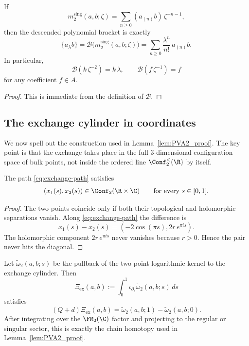 \begin{lemma}
\label{lem:two-point-dictionary}
If
\[
m_2^{\mathrm{sing}}(a,b;\zeta)=\sum_{n\ge0}(a_{(n)}b)\,\zeta^{-n-1},
\]
then the descended polynomial bracket is exactly
\[
\{a_\lambda b\}=\mathcal B\bigl(m_2^{\mathrm{sing}}(a,b;\zeta)\bigr)
=
\sum_{n\ge0}\frac{\lambda^n}{n!}\,a_{(n)}b.
\]
In particular,
\[
\mathcal B(k\,\zeta^{-2})=k\,\lambda,
\qquad
\mathcal B(f\,\zeta^{-1})=f
\]
for any coefficient $f\in A$.
\end{lemma}

\begin{proof}
This is immediate from the definition of $\mathcal B$.
\end{proof}

\subsection{The exchange cylinder in coordinates}

We now spell out the construction used in
Lemma~\ref{lem:PVA2_proof}.  The key point is that the exchange takes place in the
full $3$-dimensional configuration space of bulk points, not inside the ordered line
$\Conf_2^{<}(\R)$ by itself.

\begin{proposition}
\label{prop:exchange-path-avoids-diagonal}
The path \eqref{eq:exchange-path} satisfies
\[
(x_1(s),x_2(s))\in \Conf_2(\R\times\C)\qquad\text{for every }s\in[0,1].
\]
\end{proposition}

\begin{proof}
The two points coincide only if both their topological and holomorphic separations vanish.
Along \eqref{eq:exchange-path} the difference is
\[
x_1(s)-x_2(s)=(-2\cos(\pi s),2r\,e^{\pi i s}).
\]
The holomorphic component $2r\,e^{\pi i s}$ never vanishes because $r>0$.
Hence the pair never hits the diagonal.
\end{proof}

\begin{proposition}
\label{prop:cylinder-homotopy-formula}
Let $\widetilde\omega_2(a,b;s)$ be the pullback of the two-point logarithmic kernel to
the exchange cylinder.  Then
\[
\Xi_{\mathrm{ex}}(a,b):=\int_0^1 \iota_{\partial_s}\widetilde\omega_2(a,b;s)\,ds
\]
satisfies
\[
(Q+d)\Xi_{\mathrm{ex}}(a,b)
=
\widetilde\omega_2(a,b;1)-\widetilde\omega_2(a,b;0).
\]
After integrating over the $\FM_2(\C)$ factor and projecting to the regular or singular
sector, this is exactly the chain homotopy used in
Lemma~\ref{lem:PVA2_proof}.
\end{proposition}

